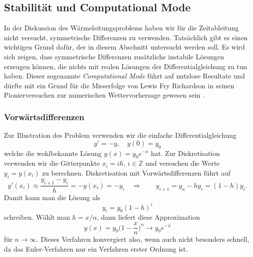 %
%
%
\subsection{Stabilität und Computational Mode
\label{pde:subsection:stabilitaet}}
In der Diskussion des Wärmeleitungsproblems haben wir für die Zeitableitung
nicht versucht, symmetrische Differenzen zu verwenden.
Tatsächlich gibt es einen wichtigen Grund dafür, der in diesem Abschnitt
untersucht werden soll.
Es wird sich zeigen, dass symmetrische Differenzen zusätzliche instabile
Lösungen erzeugen können, die nichts mit realen Lösungen der
Differentialgleichung zu tun haben.
%
%
Dieser sogenannte {\em Computational Mode}
%
führt auf nutzlose Resultate und dürfte mit ein Grund für die Misserfolge
von Lewis Fry Richardson in seinen Pionierversuchen zur numerischen
Wettervorhersage gewesen sein
\cite{buch:richardson}.
%
%

\subsubsection{Vorwärtsdifferenzen}
Zur Illustration des Problem verwenden wir die einfache Differentialgleichung
\[
y' = -y,\quad y(0)=y_0
\]
welche die wohlbekannte Lösung $y(x)=y_0e^{-x}$ hat.
Zur Diskretisation verwenden wir die Gitterpunkte $x_i=ih$, $i\in\mathbb Z$
und versuchen die Werte $y_i = y(x_i)$ zu berechnen.
Diskretisation mit Vorwärtsdifferenzen führt auf 
\[
y'(x_i) \approx \frac{y_{i+1}-y_i}{h} = -y(x_i) = -y_i
\quad\Rightarrow\qquad
y_{i+1} = y_u-hy_i = (1-h)y_i.
\]
Damit kann man die Lösung als 
\[
y_i = y_0(1-h)^i
\]
schreiben.
Wählt man $h=x/n$, dann liefert diese Approximation
\[
y(x) = y_0\biggl(1-\frac{x}n\biggr)^n 
\to
y_0e^{-x}
\]
für $n\to\infty$.
Dieses Verfahren konvergiert also, wenn auch nicht besonders schnell,
da das Euler-Verfahren nur ein Verfahren erster Ordnung ist.
%

